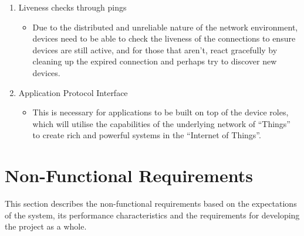 \begin{enumerate}
\begin{itemize}
	\end{itemize}
	\item Liveness checks through pings
	\begin{itemize}
		\item Due to the distributed and unreliable nature of the network environment, devices need to be able to check the liveness of the connections to ensure devices are still active, and for those that aren't, react gracefully by cleaning up the expired connection and perhaps try to discover new devices.
	\end{itemize}
	\item Application Protocol Interface
	\begin{itemize}
		\item This is necessary for applications to be built on top of the device roles, which will utilise the capabilities of the underlying network of ``Things'' to create rich and powerful systems in the ``Internet of Things''.
	\end{itemize}
\end{enumerate}

\section{Non-Functional Requirements} %
\label{sec:non_functional_requirements}
This section describes the non-functional requirements based on the expectations of the system, its performance characteristics and the requirements for developing the project as a whole.
